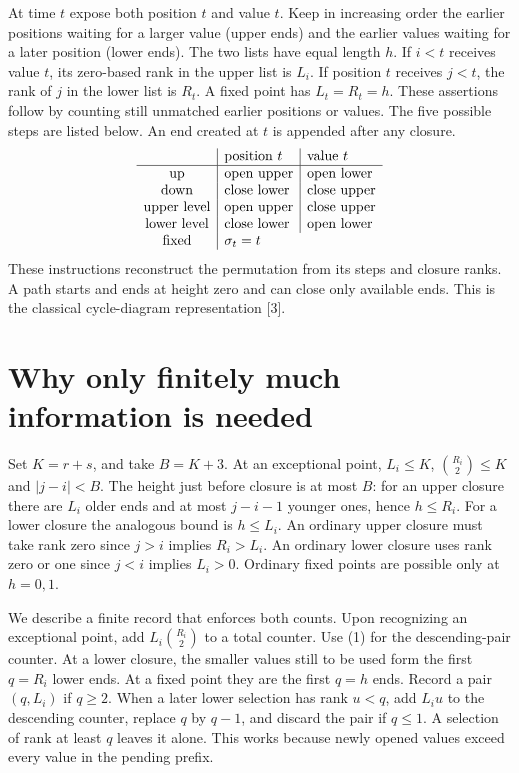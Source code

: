 \documentclass[11pt,letterpaper]{article}
\begin{document}
At time $t$ expose both position $t$ and value $t$. Keep in increasing order the earlier positions waiting for a larger value (upper ends) and the earlier values waiting for a later position (lower ends). The two lists have equal length $h$. If $i<t$ receives value $t$, its zero-based rank in the upper list is $L_i$. If position $t$ receives $j<t$, the rank of $j$ in the lower list is $R_t$. A fixed point has $L_t=R_t=h$. These assertions follow by counting still unmatched earlier positions or values. The five possible steps are listed below. An end created at $t$ is appended after any closure.
\[
\begin{array}{c|l|l}
 &\text{position }t&\text{value }t\\ \hline
 \text{up}&\text{open upper}&\text{open lower}\\
 \text{down}&\text{close lower}&\text{close upper}\\
 \text{upper level}&\text{open upper}&\text{close upper}\\
 \text{lower level}&\text{close lower}&\text{open lower}\\
 \text{fixed}&\multicolumn{2}{l}{\sigma_t=t}
\end{array}
\]
These instructions reconstruct the permutation from its steps and closure ranks. A path starts and ends at height zero and can close only available ends. This is the classical cycle-diagram representation [3].

\section{Why only finitely much information is needed}
Set $K=r+s$, and take $B=K+3$. At an exceptional point, $L_i\le K$, $\binom{R_i}{2}\le K$ and $|j-i|<B$. The height just before closure is at most $B$: for an upper closure there are $L_i$ older ends and at most $j-i-1$ younger ones, hence $h\le R_i$. For a lower closure the analogous bound is $h\le L_i$. An ordinary upper closure must take rank zero since $j>i$ implies $R_i>L_i$. An ordinary lower closure uses rank zero or one since $j<i$ implies $L_i>0$. Ordinary fixed points are possible only at $h=0,1$.

We describe a finite record that enforces both counts. Upon recognizing an exceptional point, add $L_i\binom{R_i}{2}$ to a total counter. Use (1) for the descending-pair counter. At a lower closure, the smaller values still to be used form the first $q=R_i$ lower ends. At a fixed point they are the first $q=h$ ends. Record a pair $(q,L_i)$ if $q\ge2$. When a later lower selection has rank $u<q$, add $L_i u$ to the descending counter, replace $q$ by $q-1$, and discard the pair if $q\le1$. A selection of rank at least $q$ leaves it alone. This works because newly opened values exceed every value in the pending prefix.
\end{document}
